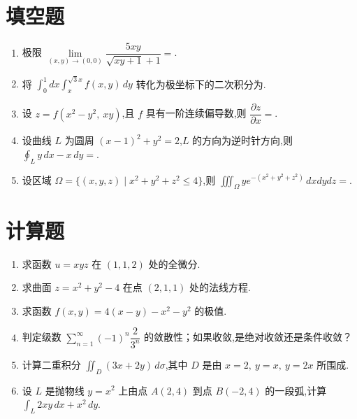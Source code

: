 \section{填空题}

\begin{enumerate}
	\item 极限 $\lim\limits_{(x,y)\to(0,0)}\dfrac{5xy}{\sqrt{xy+1}+1}=$\underline{\hspace{2cm}}.
	
	\item 将 $\int_{0}^{1}dx\int_{x}^{\sqrt{3}x}f(x,y)\,dy$ 转化为极坐标下的二次积分为\underline{\hspace{2cm}}.
	
	\item 设 $z=f(x^2-y^2,\ xy)$,且 $f$ 具有一阶连续偏导数,则
	$\dfrac{\partial z}{\partial x}=$\underline{\hspace{2cm}}.
	
	\item 设曲线 $L$ 为圆周 $(x-1)^2+y^2=2$,$L$ 的方向为逆时针方向,则
	$\oint_L y\,dx-x\,dy=$\underline{\hspace{2cm}}.
	
	\item 设区域 $\Omega=\{(x,y,z)\mid x^2+y^2+z^2\le 4\}$,则
	$\iiint_{\Omega}y e^{-(x^2+y^2+z^2)}\,dxdydz=$\underline{\hspace{2cm}}.
\end{enumerate}

\section{计算题}

\begin{enumerate}
	\item 求函数 $u=xyz$ 在 $(1,1,2)$ 处的全微分.
	
	\item 求曲面 $z=x^2+y^2-4$ 在点 $(2,1,1)$ 处的法线方程.
	
	\item 求函数 $f(x,y)=4(x-y)-x^2-y^2$ 的极值.
	
	\item 判定级数 $\sum_{n=1}^{\infty}(-1)^n\dfrac{2}{3^n}$ 的敛散性；如果收敛,是绝对收敛还是条件收敛？
	
	\item 计算二重积分 $\iint_D(3x+2y)\,d\sigma$,其中 $D$ 是由 $x=2,\ y=x,\ y=2x$ 所围成.
	
	\item 设 $L$ 是抛物线 $y=x^2$ 上由点 $A(2,4)$ 到点 $B(-2,4)$ 的一段弧,计算
	$\int_L 2xy\,dx+x^2\,dy$.
\end{enumerate}


